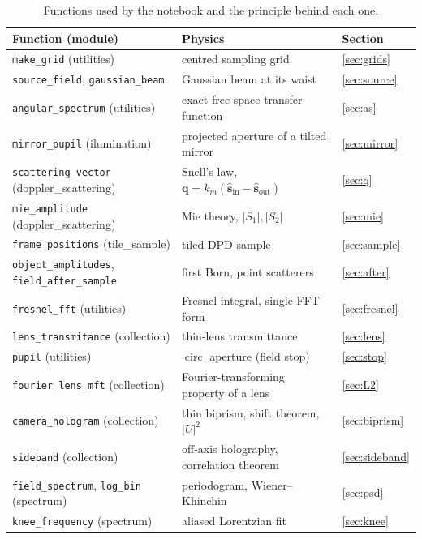 \documentclass[11pt,a4paper]{article}
\newcommand{\vq}{\mathbf{q}}
\newcommand{\shat}{\hat{\mathbf{s}}}
\newcommand{\circf}{\operatorname{circ}}
\newcommand{\code}[1]{\texttt{\small #1}}
\begin{document}
\begin{table}[ht]
\centering
\small
\caption{Functions used by the notebook and the principle behind each one.}
\label{tab:functions}
\begin{tabular}{@{}lll@{}}
\toprule
Function (module) & Physics & Section \\
\midrule
\code{make\_grid} (utilities) & centred sampling grid & \ref{sec:grids} \\
\code{source\_field}, \code{gaussian\_beam} & Gaussian beam at its waist & \ref{sec:source} \\
\code{angular\_spectrum} (utilities) & exact free-space transfer function & \ref{sec:as} \\
\code{mirror\_pupil} (ilumination) & projected aperture of a tilted mirror & \ref{sec:mirror} \\
\code{scattering\_vector} (doppler\_scattering) & Snell's law, $\vq = k_m(\shat_\mathrm{in}-\shat_\mathrm{out})$ & \ref{sec:q} \\
\code{mie\_amplitude} (doppler\_scattering) & Mie theory, $|S_1|,|S_2|$ & \ref{sec:mie} \\
\code{frame\_positions} (tile\_sample) & tiled DPD sample & \ref{sec:sample} \\
\code{object\_amplitudes}, \code{field\_after\_sample} & first Born, point scatterers & \ref{sec:after} \\
\code{fresnel\_fft} (utilities) & Fresnel integral, single-FFT form & \ref{sec:fresnel} \\
\code{lens\_transmitance} (collection) & thin-lens transmittance & \ref{sec:lens} \\
\code{pupil} (utilities) & $\circf$ aperture (field stop) & \ref{sec:stop} \\
\code{fourier\_lens\_mft} (collection) & Fourier-transforming property of a lens & \ref{sec:L2} \\
\code{camera\_hologram} (collection) & thin biprism, shift theorem, $|U|^2$ & \ref{sec:biprism} \\
\code{sideband} (collection) & off-axis holography, correlation theorem & \ref{sec:sideband} \\
\code{field\_spectrum}, \code{log\_bin} (spectrum) & periodogram, Wiener--Khinchin & \ref{sec:psd} \\
\code{knee\_frequency} (spectrum) & aliased Lorentzian fit & \ref{sec:knee} \\
\bottomrule
\end{tabular}
\end{table}
\end{document}
